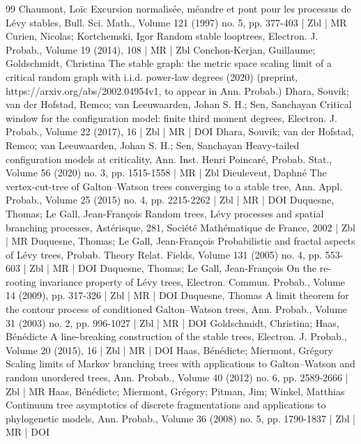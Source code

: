 \begin{thebibliography}{99}
Chaumont, Loïc Excursion normalisée, méandre et pont pour les processus de Lévy stables, Bull. Sci. Math., Volume 121 (1997) no. 5, pp. 377-403 | Zbl | MR
Curien, Nicolas; Kortchemski, Igor Random stable looptrees, Electron. J. Probab., Volume 19 (2014), 108 | MR | Zbl
Conchon-Kerjan, Guillaume; Goldschmidt, Christina The stable graph: the metric space scaling limit of a critical random graph with i.i.d. power-law degrees (2020) (preprint, https://arxiv.org/abs/2002.04954v1, to appear in Ann. Probab.)
Dhara, Souvik; van der Hofstad, Remco; van Leeuwaarden, Johan S. H.; Sen, Sanchayan Critical window for the configuration model: finite third moment degrees, Electron. J. Probab., Volume 22 (2017), 16 | Zbl | MR | DOI
Dhara, Souvik; van der Hofstad, Remco; van Leeuwaarden, Johan S. H.; Sen, Sanchayan Heavy-tailed configuration models at criticality, Ann. Inst. Henri Poincaré, Probab. Stat., Volume 56 (2020) no. 3, pp. 1515-1558 | MR | Zbl
Dieuleveut, Daphné The vertex-cut-tree of Galton–Watson trees converging to a stable tree, Ann. Appl. Probab., Volume 25 (2015) no. 4, pp. 2215-2262 | Zbl | MR | DOI
Duquesne, Thomas; Le Gall, Jean-François Random trees, Lévy processes and spatial branching processes, Astérisque, 281, Société Mathématique de France, 2002 | Zbl | MR
Duquesne, Thomas; Le Gall, Jean-François Probabilistic and fractal aspects of Lévy trees, Probab. Theory Relat. Fields, Volume 131 (2005) no. 4, pp. 553-603 | Zbl | MR | DOI
Duquesne, Thomas; Le Gall, Jean-François On the re-rooting invariance property of Lévy trees, Electron. Commun. Probab., Volume 14 (2009), pp. 317-326 | Zbl | MR | DOI
Duquesne, Thomas A limit theorem for the contour process of conditioned Galton–Watson trees, Ann. Probab., Volume 31 (2003) no. 2, pp. 996-1027 | Zbl | MR | DOI
Goldschmidt, Christina; Haas, Bénédicte A line-breaking construction of the stable trees, Electron. J. Probab., Volume 20 (2015), 16 | Zbl | MR | DOI
Haas, Bénédicte; Miermont, Grégory Scaling limits of Markov branching trees with applications to Galton–Watson and random unordered trees, Ann. Probab., Volume 40 (2012) no. 6, pp. 2589-2666 | Zbl | MR
Haas, Bénédicte; Miermont, Grégory; Pitman, Jim; Winkel, Matthias Continuum tree asymptotics of discrete fragmentations and applications to phylogenetic models, Ann. Probab., Volume 36 (2008) no. 5, pp. 1790-1837 | Zbl | MR | DOI

\end{thebibliography}
